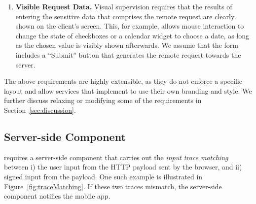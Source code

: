 \begin{enumerate}
	\item[\five] \textbf{Visible Request Data.}
	Visual supervision requires that the results of entering the sensitive data that comprises the remote request are clearly shown on the client's screen.
	This, for example, allows mouse interaction to change the state of checkboxes or a calendar widget to choose a date, as long as the chosen value is visibly shown afterwards.
	We assume that the form includes a ``Submit'' button that generates the remote request towards the server.

\end{enumerate}

The above requirements are highly extensible, as they do not enforce a specific layout and allow services that implement \name to use their own branding and style.
We further discuss relaxing or modifying some of the requirements in Section~\ref{sec:discussion}.



\subsection{Server-side Component}
\label{sec:systemDesign:webserver}

\sysname requires a server-side component that carries out the \emph{input trace matching} between i) the user input from the HTTP payload sent by the browser, and ii) signed input from the \sysname \tls payload. One such example is illustrated in Figure~\ref{fig:traceMatching}. If these two traces mismatch, the \name server-side component notifies the \name mobile app.

